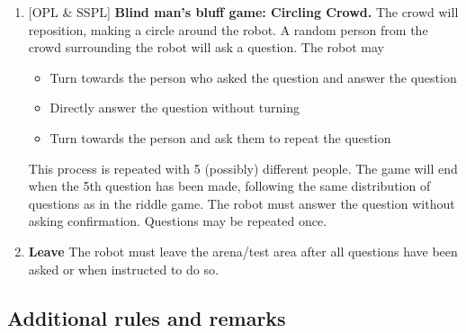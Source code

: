\begin{enumerate}
    \setcounter{enumi}{\theenumTempSPR}
    \item {[OPL \& SSPL]} \textbf{Blind man's bluff game: Circling Crowd.} The crowd will reposition, making a circle around the robot. A random person from the crowd surrounding the robot will ask a question. The robot may
    \begin{itemize}
        \item Turn towards the person who asked the question and answer the question
        \item Directly answer the question without turning
        \item Turn towards the person and ask them to repeat the question
    \end{itemize}
    This process is repeated with 5 (possibly) different people.
    The game will end when the 5th question has been made, following the same distribution of questions as in the riddle game. The robot must answer the question without asking confirmation. Questions may be repeated once.

    \item \textbf{Leave} The robot must leave the arena/test area after all questions have been asked or when instructed to do so.
\end{enumerate}

\subsection{Additional rules and remarks}

